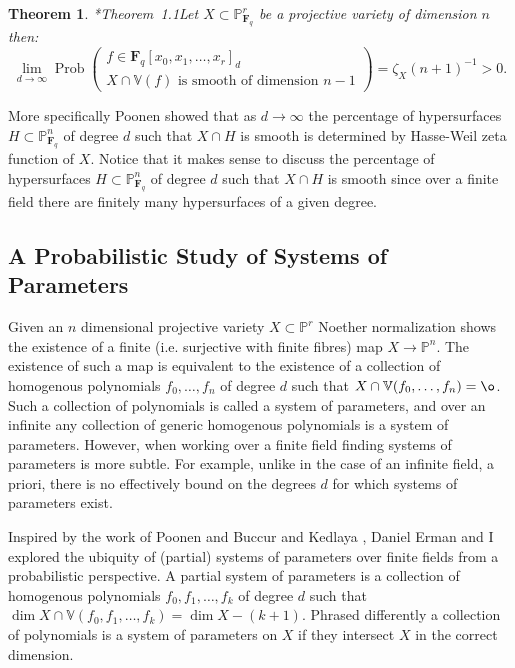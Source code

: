 \documentclass[10pt,reqno]{amsart}
\newtheorem{theorem}[lemma]{Theorem}
\theoremstyle{remark}
\newcommand{\Prob}{\operatorname{Prob}}
\newcommand{\fF}{\mathbf F}
\renewcommand{\P}{\mathbb{P}}
\newcommand{\V}{\mathbb{V}}
\begin{document}
\begin{theorem}\cite{poonen04}*{Theorem~1.1}\label{thm:poonen}
Let $X\subset \P^{r}_{\fF_{q}}$ be a projective variety of dimension $n$ then:
\begin{equation}\label{eq:poonen}
\lim_{d\to \infty} \Prob\left(\begin{matrix} f\in \fF_{q}[x_{0},x_{1},\ldots,x_{r}]_{d}\\ \text{$X\cap \V(f)$ is smooth of dimension $n-1$}\end{matrix}\right)=
\zeta_X(n+1)^{-1} >0.
\end{equation}
\end{theorem}

More specifically Poonen showed that as $d\to\infty$ the percentage of hypersurfaces $H\subset \P_{\fF_{q}}^{n}$ of degree $d$ such that $X\cap H$ is smooth is determined by Hasse-Weil zeta function of $X$. Notice that it makes sense to discuss the percentage of hypersurfaces $H\subset \P_{\fF_{q}}^{n}$ of degree $d$ such that $X\cap H$ is smooth since over a finite field there are finitely many hypersurfaces of a given degree.


\subsection{A Probabilistic Study of Systems of Parameters} 

Given an $n$ dimensional projective variety $X\subset \P^r$ Noether normalization shows the existence of a finite (i.e. surjective with finite fibres) map $X\rightarrow \P^n$. The existence of such a map is equivalent to the existence of a collection of homogenous polynomials $f_{0},\ldots,f_{n}$ of degree $d$ such that $X\cap \V(f_{0},\ldots,f_{n})=\o$. Such a collection of polynomials is called a system of parameters, and over an infinite any collection of generic homogenous polynomials is a system of parameters. However, when working over a finite field finding systems of parameters is more subtle. For example, unlike in the case of an infinite field, a priori, there is no effectively bound on the degrees $d$ for which systems of parameters exist. 

Inspired by the work of Poonen \cite{poonen04} and Buccur and Kedlaya \cite{bucurKedlaya12}, Daniel Erman and I explored the ubiquity of (partial) systems of parameters over finite fields from a probabilistic perspective. A partial system of parameters is a collection of homogenous polynomials $f_{0},f_{1},\ldots,f_{k}$ of degree $d$ such that $\dim X\cap \V(f_{0},f_{1},\ldots,f_{k}) = \dim X - (k+1)$. Phrased differently a collection of polynomials is a system of parameters on $X$ if they intersect $X$ in the correct dimension. 
\end{document}
